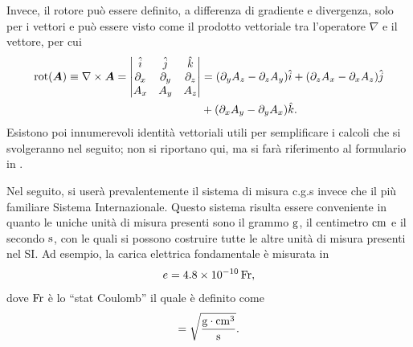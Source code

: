 Invece, il rotore può essere definito, a differenza di gradiente e divergenza, solo per i vettori e può essere visto come il prodotto vettoriale tra l'operatore $\nabla$ e il vettore, per cui
\begin{equation}
    \begin{aligned}
        \mathrm{rot}(\bm{A}) \equiv \nabla \times \bm{A} = 
        \begin{vmatrix}
            \hat{i} & \hat{j} & \hat{k} \\
            \partial_x & \partial_y & \partial_z \\
            A_x & A_y & A_z
        \end{vmatrix} &= (\partial_yA_z - \partial_zA_y)\hat{i} + (\partial_zA_x - \partial_xA_z)\hat{j} \\
        &+ (\partial_xA_y - \partial_yA_x)\hat{k}.
    \end{aligned}
\end{equation}
Esistono poi innumerevoli identità vettoriali utili per semplificare i calcoli che si svolgeranno nel seguito; non si riportano qui, ma si farà riferimento al formulario in \cite{NRLPlasmaFormulary}.

Nel seguito, si userà prevalentemente il sistema di misura c.g.s invece che il più familiare Sistema Internazionale. Questo sistema risulta essere conveniente in quanto le uniche unità di misura presenti sono il grammo $\mathrm{g}$, il centimetro $\mathrm{cm}$ e il secondo $\mathrm{s}$, con le quali si possono costruire tutte le altre unità di misura presenti nel SI. Ad esempio, la carica elettrica fondamentale è misurata in 
\begin{equation}
    e = \SI{4.8e-10}{\mathrm{Fr}},
\end{equation}
dove $\mathrm{Fr}$ è lo ``stat Coulomb'' il quale è definito come 
\begin{equation}
    [\rem{Fr}] = \sqrt{\frac{\rem{g}\cdot\rem{cm}^3}{\rem{s}}}.
\end{equation}

